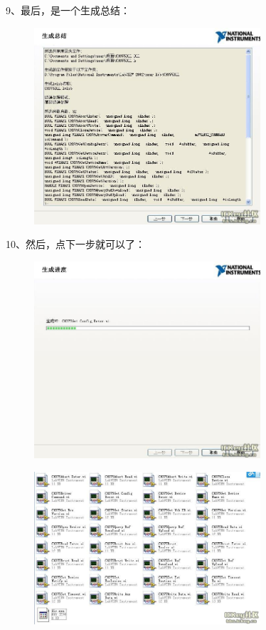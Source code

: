 9、最后，是一个生成总结：
\begin{figure}[h!]
\centering
\includegraphics[width=0.75\textwidth]{pictures/9.jpg}
\end{figure}

10、然后，点下一步就可以了：
\begin{figure}[h!]
\centering
\includegraphics[width=0.75\textwidth]{pictures/10.jpg}
\end{figure}

\begin{figure}[h!]
\centering
\includegraphics[width=0.75\textwidth]{pictures/11.jpg}
\end{figure}



